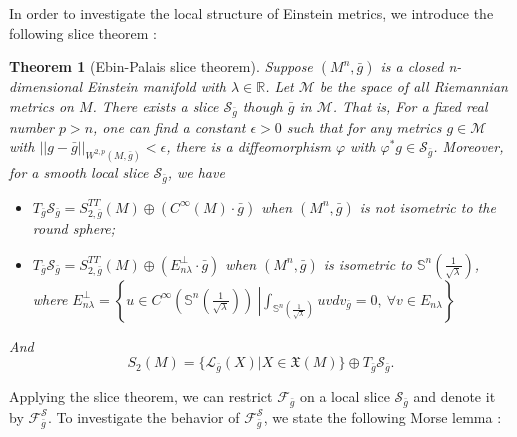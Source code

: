 \documentclass[12pt]{amsart}
\newtheorem{theor}{Theorem}[section]
\newcommand{\bg}{\bar{g}}
\numberwithin{equation}{section}
\begin{document}
In order to investigate the local structure of Einstein metrics, we introduce the following slice theorem \cite{BrendleMaruqes, Viaclovsky2016}:
\begin{theor}[Ebin-Palais slice theorem]\label{Theorem: Ebin-Palais slice theorem}
    Suppose $(M^n,\bg)$ is a closed n-dimensional Einstein manifold with $\lambda \in \mathbb{R}$. Let $\mathcal{M}$ be the space of all Riemannian metrics on $M$. There exists a slice $\mathcal{S}_{\bg}$ though $\bg$ in $\mathcal{M}$. That is, For a fixed real number $p>n$, one can find a constant $\epsilon>0$ such that for any metrics $g \in \mathcal{M}$ with $||g-\bg||_{W^{2,p}(M,\bg)} < \epsilon$, there is a diffeomorphism $\varphi$ with $\varphi^*g\in\mathcal{S}_{\bg}$. Moreover, for a smooth local slice $\mathcal{S}_{\bg}$, we have \begin{itemize}
        \item $T_{\bg}\mathcal{S}_{\bg}=S_{2,\bg}^{TT}(M)\oplus(C^{\infty}(M)\cdot\bg)$ when $(M^n,\bg)$ is not isometric to the round sphere;
        \item $T_{\bg}\mathcal{S}_{\bg}=S_{2,\bg}^{TT}(M)\oplus(E_{n\lambda}^{\perp}\cdot\bg)$ when $(M^n,\bg)$ is isometric to $\mathbb{S}^n(\frac{1}{\sqrt{\lambda}})$,\\
        where $E_{n\lambda}^{\perp}=\left\{\left.u\in C^{\infty}\left(\mathbb{S}^n\left(\frac{1}{\sqrt{\lambda}}\right)\right)\ \right|\int_{\mathbb{S}^n\left(\frac{1}{\sqrt{\lambda}}\right)}uvdv_{\bg}=0,\ \forall v\in E_{n\lambda}\right\}$ 
    \end{itemize}
    And
    \begin{equation*}
        S_2(M)=\{\mathcal{L}_{\bg}(X)|X\in\mathfrak{X}(M)\}\oplus T_{\bg}\mathcal{S}_{\bg}.
    \end{equation*}
    
\end{theor}

Applying the slice theorem, we can restrict $\mathcal{F}_{{\bg}}$ on a local slice $\mathcal{S}_{\bg}$ and denote it by $\mathcal{F}_{{\bg}}^{\mathcal{S}}$. To investigate the behavior of $\mathcal{F}_{{\bg}}^{\mathcal{S}}$, we state the following Morse lemma \cite{Fischer1975}:
\end{document}
